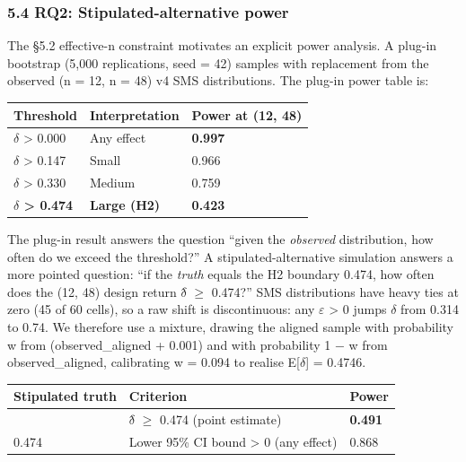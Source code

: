 \documentclass[review,12pt,authoryear]{elsarticle}
\newcounter{none}                   %
\begin{document}
\subsubsection{5.4 RQ2: Stipulated-alternative
power}\label{rq2-stipulated-alternative-power}

The §5.2 effective-n constraint motivates an explicit power analysis. A
plug-in bootstrap (5,000 replications, seed = 42) samples with
replacement from the observed (n = 12, n = 48) v4 SMS distributions. The
plug-in power table is:

{\def\LTcaptype{none} %
\begin{longtable}[]{@{}lll@{}}
\toprule\noalign{}
Threshold & Interpretation & Power at (12, 48) \\
\midrule\noalign{}
\endhead
\bottomrule\noalign{}
\endlastfoot
$\delta$ \textgreater{} 0.000 & Any effect & \textbf{0.997} \\
$\delta$ \textgreater{} 0.147 & Small & 0.966 \\
$\delta$ \textgreater{} 0.330 & Medium & 0.759 \\
\textbf{$\delta$ \textgreater{} 0.474} & \textbf{Large (H2)} &
\textbf{0.423} \\
\end{longtable}
}

The plug-in result answers the question ``given the \emph{observed}
distribution, how often do we exceed the threshold?'' A
stipulated-alternative simulation answers a more pointed question: ``if
the \emph{truth} equals the H2 boundary 0.474, how often does the (12,
48) design return $\delta$̂ $\geq$ 0.474?'' SMS distributions have heavy ties at zero
(45 of 60 cells), so a raw shift is discontinuous: any $\varepsilon$ \textgreater{}
0 jumps $\delta$ from 0.314 to 0.74. We therefore use a mixture, drawing the
aligned sample with probability w from (observed\_aligned + 0.001) and
with probability 1 − w from observed\_aligned, calibrating w = 0.094 to
realise E{[}$\delta${]} = 0.4746.

{\def\LTcaptype{none} %
\begin{longtable}[]{@{}lll@{}}
\toprule\noalign{}
Stipulated truth & Criterion & Power \\
\midrule\noalign{}
\endhead
\bottomrule\noalign{}
\endlastfoot
0.474 & $\delta$̂ $\geq$ 0.474 (point estimate) & \textbf{0.491} \\
0.474 & Lower 95\% CI bound \textgreater{} 0 (any effect) & 0.868 \\
\end{longtable}
}
\end{document}
